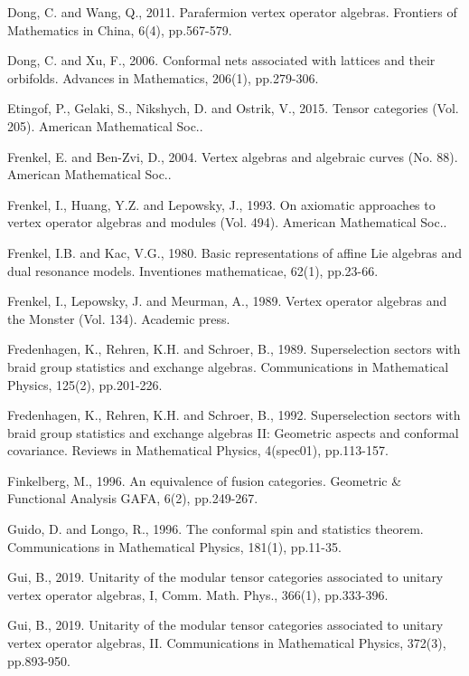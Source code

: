 \documentclass[11pt,b5paper,notitlepage]{article}
\theoremstyle{definition}
\theoremstyle{plain}
\numberwithin{equation}{subsection}
\begin{document}
\begin{thebibliography}{999999}
Dong, C. and Wang, Q., 2011. Parafermion vertex operator algebras. Frontiers of Mathematics in China, 6(4), pp.567-579.

Dong, C. and Xu, F., 2006. Conformal nets associated with lattices and their orbifolds. Advances in Mathematics, 206(1), pp.279-306.

Etingof, P., Gelaki, S., Nikshych, D. and Ostrik, V., 2015. Tensor categories (Vol. 205). American Mathematical Soc..

Frenkel, E. and Ben-Zvi, D., 2004. Vertex algebras and algebraic curves (No. 88). American Mathematical Soc..

Frenkel, I., Huang, Y.Z. and Lepowsky, J., 1993. On axiomatic approaches to vertex operator algebras and modules (Vol. 494). American Mathematical Soc..

Frenkel, I.B. and Kac, V.G., 1980. Basic representations of affine Lie algebras and dual resonance models. Inventiones mathematicae, 62(1), pp.23-66.

Frenkel, I., Lepowsky, J. and Meurman, A., 1989. Vertex operator algebras and the Monster (Vol. 134). Academic press.

Fredenhagen, K., Rehren, K.H. and Schroer, B., 1989. Superselection sectors with braid group statistics and exchange algebras. Communications in Mathematical Physics, 125(2), pp.201-226.

Fredenhagen, K., Rehren, K.H. and Schroer, B., 1992. Superselection sectors with braid group statistics and exchange algebras II: Geometric aspects and conformal covariance. Reviews in Mathematical Physics, 4(spec01), pp.113-157.


Finkelberg, M., 1996. An equivalence of fusion categories. Geometric \& Functional Analysis GAFA, 6(2), pp.249-267.

Guido, D. and Longo, R., 1996. The conformal spin and statistics theorem. Communications in Mathematical Physics, 181(1), pp.11-35.



Gui, B., 2019. Unitarity of the modular tensor categories associated to unitary vertex operator algebras, I,  Comm. Math. Phys., 366(1), pp.333-396. 

Gui, B., 2019. Unitarity of the modular tensor categories associated to unitary vertex operator algebras, II. Communications in Mathematical Physics, 372(3), pp.893-950.


\end{thebibliography}
\end{document}
